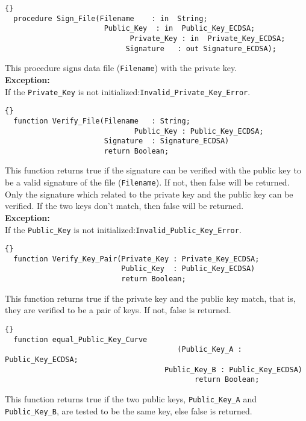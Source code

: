 \hhline
\begin{lstlisting}{}
  procedure Sign_File(Filename    : in  String;
          		       Public_Key  : in  Public_Key_ECDSA;
					     	 Private_Key : in  Private_Key_ECDSA;
						    Signature   : out Signature_ECDSA);
\end{lstlisting}
This procedure signs data file (\texttt{Filename}) with the private
key.\\

\noindent\textbf{Exception:}\\ If the \texttt{Private\_Key} is not
initialized:\quad \texttt{Invalid\_Private\_Key\_Error}.

\hhline
\begin{lstlisting}{}
  function Verify_File(Filename   : String;
					 		  Public_Key : Public_Key_ECDSA;
                       Signature  : Signature_ECDSA)
                       return Boolean;
\end{lstlisting}
This function returns true if the signature can be verified with the
public key to be a valid signature of the file (\texttt{Filename}). If
not, then false will be returned.\\ Only the signature which related
to the private key and the public key can be verified. If the two keys
don't match, then false will be returned.\\

\noindent\textbf{Exception:}\\ If the \texttt{Public\_Key} is not
initialized:\quad \texttt{Invalid\_Public\_Key\_Error}.\\


\hhline
\begin{lstlisting}{}
  function Verify_Key_Pair(Private_Key : Private_Key_ECDSA;
                           Public_Key  : Public_Key_ECDSA)
                           return Boolean;
\end{lstlisting}
This function returns true if the private key and the public key
match, that is, they are verified to be a pair of keys. If not, false
is returned.

\hhline
\begin{lstlisting}{}
  function equal_Public_Key_Curve
  					  					(Public_Key_A : Public_Key_ECDSA;
		              				 Public_Key_B : Public_Key_ECDSA)
								 			return Boolean;
\end{lstlisting}
This function returns true if the two public keys, \texttt{Public\_Key\_A} and \texttt{Public\_Key\_B}, are tested to be the same key, else false is returned.\\
